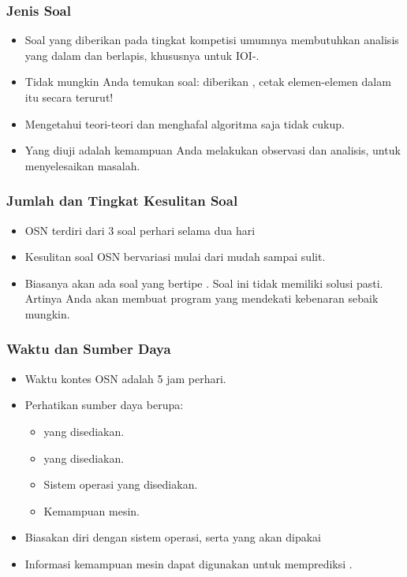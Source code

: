 \begin{frame}
  \frametitle{Jenis Soal}
  \begin{itemize}
    \item Soal yang diberikan pada tingkat kompetisi umumnya membutuhkan analisis yang dalam dan berlapis, khususnya untuk IOI-.
    \item Tidak mungkin Anda temukan soal: diberikan \farray, cetak elemen-elemen dalam \farray itu secara terurut!
    \item Mengetahui teori-teori dan menghafal algoritma saja tidak cukup.
    \item Yang diuji adalah kemampuan Anda melakukan observasi dan analisis, untuk menyelesaikan masalah.
  \end{itemize}
\end{frame}

\begin{frame}
  \frametitle{Jumlah dan Tingkat Kesulitan Soal}
    
  \begin{itemize}
    \item OSN terdiri dari 3 soal perhari selama dua hari
    \item Kesulitan soal OSN bervariasi mulai dari mudah sampai sulit.
    \item Biasanya akan ada soal yang bertipe . Soal ini tidak memiliki solusi pasti. Artinya Anda akan membuat program yang mendekati kebenaran sebaik mungkin.
  \end{itemize}
\end{frame}

\begin{frame}
  \frametitle{Waktu dan Sumber Daya}
  \begin{itemize}
    \item Waktu kontes OSN adalah 5 jam perhari.
    \item Perhatikan sumber daya berupa:
    \begin{itemize}
      \item {} yang disediakan.
      \item {} yang disediakan.
      \item Sistem operasi yang disediakan.
      \item Kemampuan mesin.
    \end{itemize}
    \item Biasakan diri dengan sistem operasi,  serta  yang akan dipakai
    \item Informasi kemampuan mesin dapat digunakan untuk memprediksi .
  \end{itemize}
\end{frame}

